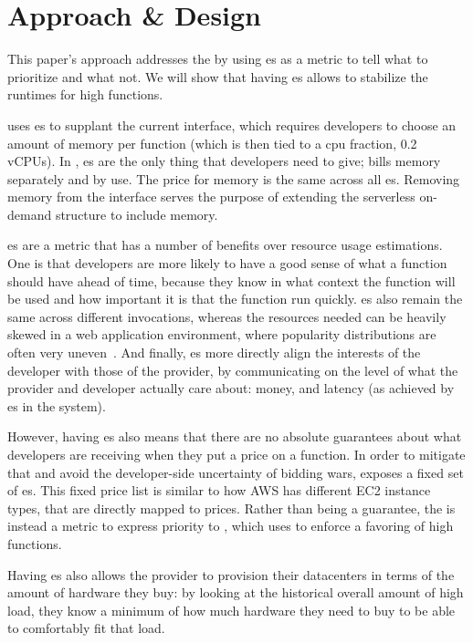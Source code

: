 \section{Approach \& Design}\label{design}

This paper's approach addresses the \problem{} by using \priceclass{}es as a
metric to tell \sys{} what to prioritize and what not. We will show that having
\priceclass{}es allows \sys{} to stabilize the runtimes for high \class{}
functions. 

\Sys{} uses \class{}es to supplant the current interface, which requires
developers to choose an amount of memory per function (which is then tied to a cpu
fraction, \eg{} 0.2 vCPUs). In \sys{}, \priceclass{}es are the only thing
that developers need to give; \sys{} bills memory separately and by use. The
price for memory is the same across all \class{}es. Removing memory from the
interface serves the purpose of extending the serverless on-demand structure to
include memory.

\Priceclass{}es are a metric that has a number of benefits over resource usage
estimations. One is that developers are more likely to have a good sense of what
\priceclass{} a function should have ahead of time, because they know in what
context the function will be used and how important it is that the function run
quickly. \Priceclass{}es also remain the same across different invocations,
whereas the resources needed can be heavily skewed in a web application
environment, where popularity distributions are often very
uneven~\cite{hermod,serverless-in-the-wild}. And finally, \class{}es more
directly align the interests of the developer with those of the provider, by
communicating on the level of what the provider and developer actually care
about: money, and latency (as achieved by \class{}es in the system).

However, having \priceclass{}es also means that there are no absolute guarantees
about what developers are receiving when they put a price on a function. In
order to mitigate that and avoid the developer-side uncertainty of bidding wars,
\sys{} exposes a fixed set of \priceclass{}es. This fixed price list is similar
to how AWS has different EC2 instance types, that are directly mapped to prices.
Rather than being a guarantee, the \priceclass{} is instead a metric to express
priority to \sys{}, which \sys{} uses to enforce a favoring of high \class{}
functions.

Having \priceclass{}es also allows the provider to provision their datacenters
in terms of the amount of hardware they buy: by looking at the historical
overall amount of high \priceclass{} load, they know a minimum of how much
hardware they need to buy to be able to comfortably fit that load.


